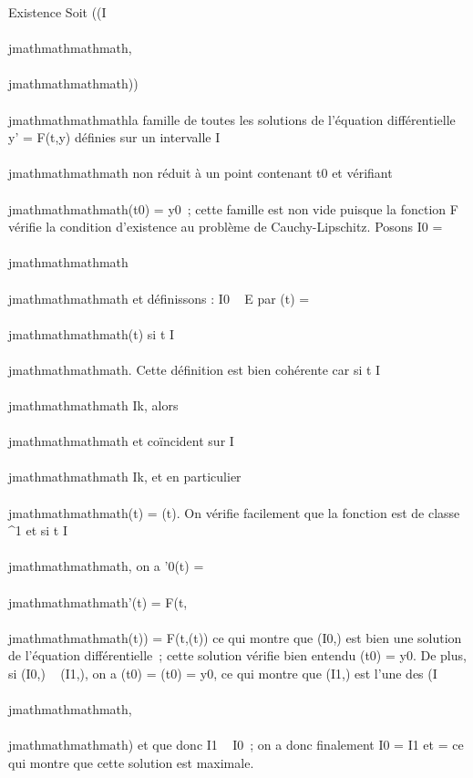 Existence Soit \left
((I\\\\jmathmathmathmath,\psi\\\\jmathmathmathmath)\right )\\\\jmathmathmathmath{} la
famille de toutes les solutions de l'équation différentielle y' = F(t,y)
définies sur un intervalle I\\\\jmathmathmathmath non réduit à un point contenant
t0 et vérifiant \psi\\\\jmathmathmathmath(t0) = y0~;
cette famille est non vide puisque la fonction F vérifie la condition
d'existence au problème de Cauchy-Lipschitz. Posons I0
= \⋃ ~
\\\\jmathmathmathmath{}\\\\jmathmathmathmath et définissons  : I0 \rightarrow~ E
par (t) = \psi\\\\jmathmathmathmath(t) si t \in I\\\\jmathmathmathmath. Cette
définition est bien cohérente car si t \in I\\\\jmathmathmathmath \bigcap Ik,
alors \psi\\\\jmathmathmathmath et \psik coïncident sur I\\\\jmathmathmathmath \bigcap
Ik, et en particulier \psi\\\\jmathmathmathmath(t) = \psik(t). On
vérifie facilement que la fonction  est de classe
^1 et si t \in I\\\\jmathmathmathmath, on a \phi'0(t) =
\psi\\\\jmathmathmathmath'(t) = F(t,\psi\\\\jmathmathmathmath(t)) = F(t,(t)) ce qui
montre que (I0,) est bien une solution de
l'équation différentielle~; cette solution vérifie bien entendu
(t0) = y0. De plus, si
(I0,) \prec~ (I1,), on a
(t0) = (t0) = y0,
ce qui montre que (I1,) est l'une des
(I\\\\jmathmathmathmath,\psi\\\\jmathmathmathmath) et que donc I1 \subset~ I0~; on
a donc finalement I0 = I1 et  =
 ce qui montre que cette solution est maximale.

